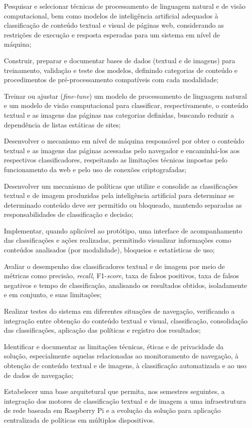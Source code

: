 \documentclass[
    12pt,           %
    oneside,        %
    a4paper,        %
    chapter=TITLE,  %
    english,        %
    brazil          %
]{abntex2}
\begin{document}
\begin{alineas}
    \item Pesquisar e selecionar técnicas de processamento de linguagem natural e de visão computacional, bem como modelos de inteligência artificial adequados à classificação de conteúdo textual e visual de páginas web, considerando as restrições de execução e resposta esperadas para um sistema em nível de máquina;
    \item Construir, preparar e documentar bases de dados (textual e de imagens) para treinamento, validação e teste dos modelos, definindo categorias de conteúdo e procedimentos de pré-processamento compatíveis com cada modalidade;
    \item Treinar ou ajustar (\textit{fine-tune}) um modelo de processamento de linguagem natural e um modelo de visão computacional para classificar, respectivamente, o conteúdo textual e as imagens das páginas nas categorias definidas, buscando reduzir a dependência de listas estáticas de sites;
    \item Desenvolver o mecanismo em nível de máquina responsável por obter o conteúdo textual e as imagens das páginas acessadas pelo navegador e encaminhá-los aos respectivos classificadores, respeitando as limitações técnicas impostas pelo funcionamento da web e pelo uso de conexões criptografadas;
    \item Desenvolver um mecanismo de políticas que utilize e consolide as classificações textual e de imagem produzidas pela inteligência artificial para determinar se determinado conteúdo deve ser permitido ou bloqueado, mantendo separadas as responsabilidades de classificação e decisão;
    \item Implementar, quando aplicável ao protótipo, uma interface de acompanhamento das classificações e ações realizadas, permitindo visualizar informações como conteúdos analisados (por modalidade), bloqueios e estatísticas de uso;
    \item Avaliar o desempenho dos classificadores textual e de imagem por meio de métricas como precisão, \textit{recall}, F1-\textit{score}, taxa de falsos positivos, taxa de falsos negativos e tempo de classificação, analisando os resultados obtidos, isoladamente e em conjunto, e suas limitações;
    \item Realizar testes do sistema em diferentes situações de navegação, verificando a integração entre obtenção do conteúdo textual e visual, classificação, consolidação das classificações, aplicação das políticas e registro dos resultados;
    \item Identificar e documentar as limitações técnicas, éticas e de privacidade da solução, especialmente aquelas relacionadas ao monitoramento de navegação, à obtenção de conteúdo textual e de imagens, à classificação automatizada e ao uso de dados de navegação;
    \item Estabelecer uma base arquitetural que permita, nos semestres seguintes, a integração dos motores de classificação textual e de imagem a uma infraestrutura de rede baseada em Raspberry Pi e a evolução da solução para aplicação centralizada de políticas em múltiplos dispositivos.
\end{alineas}
\end{document}
